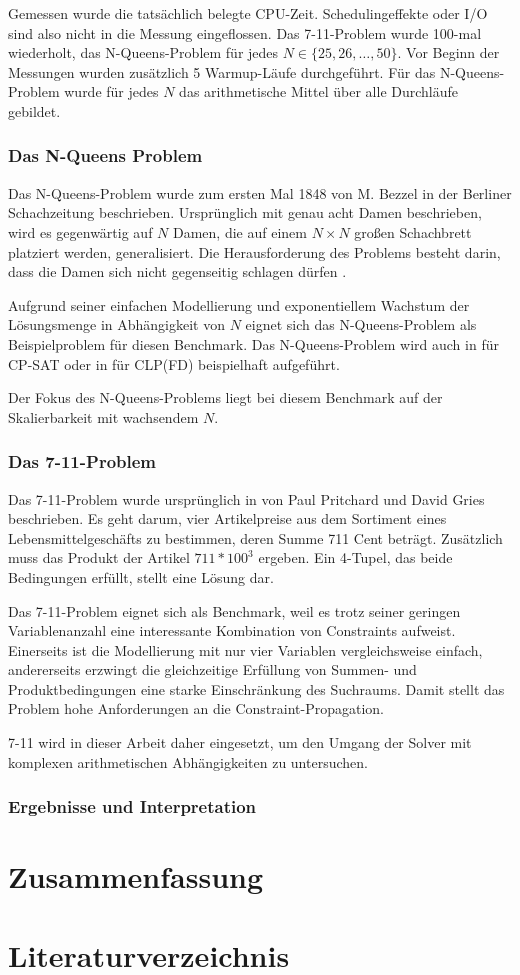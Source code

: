 \documentclass[12pt,a4paper]{article}
\begin{document}
Gemessen wurde die tatsächlich belegte CPU-Zeit.
Schedulingeffekte oder I/O sind also nicht in die Messung eingeflossen.
Das 7-11-Problem wurde 100-mal wiederholt, das N-Queens-Problem für jedes $N \in \{25,26,\dots,50\}$.
Vor Beginn der Messungen wurden zusätzlich 5 Warmup-Läufe durchgeführt.
Für das N-Queens-Problem wurde für jedes $N$ das arithmetische Mittel über alle Durchläufe gebildet.
\subsubsection{Das N-Queens Problem}
Das N-Queens-Problem wurde zum ersten Mal 1848 von M. Bezzel in der Berliner Schachzeitung beschrieben.
Ursprünglich mit genau acht Damen beschrieben, wird es gegenwärtig auf $N$ Damen, die auf einem $N \times N$ großen Schachbrett platziert werden, generalisiert.
Die Herausforderung des Problems besteht darin, dass die Damen sich nicht gegenseitig schlagen dürfen \cite{nqueens}.

Aufgrund seiner einfachen Modellierung und exponentiellem Wachstum der Lösungsmenge in Abhängigkeit von $N$ eignet sich das N-Queens-Problem als Beispielproblem für diesen Benchmark.
Das N-Queens-Problem wird auch in \cite{ortools} für CP-SAT oder in \cite{drt} für CLP(FD) beispielhaft aufgeführt. 

Der Fokus des N-Queens-Problems liegt bei diesem Benchmark auf der Skalierbarkeit mit wachsendem $N$.
\subsubsection{Das 7-11-Problem}
Das 7-11-Problem wurde ursprünglich in \cite{seven_eleven} von Paul Pritchard und David Gries beschrieben.
Es geht darum, vier Artikelpreise aus dem Sortiment eines Lebensmittelgeschäfts zu bestimmen, deren Summe 711 Cent beträgt.
Zusätzlich muss das Produkt der Artikel $711 * 100^3$ ergeben.
Ein 4-Tupel, das beide Bedingungen erfüllt, stellt eine Lösung dar. 

Das 7-11-Problem eignet sich als Benchmark, weil es trotz seiner geringen Variablenanzahl eine interessante Kombination von Constraints aufweist.
Einerseits ist die Modellierung mit nur vier Variablen vergleichsweise einfach, andererseits erzwingt die gleichzeitige Erfüllung von Summen- und Produktbedingungen eine starke Einschränkung des Suchraums.
Damit stellt das Problem hohe Anforderungen an die Constraint-Propagation.

7-11 wird in dieser Arbeit daher eingesetzt, um den Umgang der Solver mit komplexen arithmetischen Abhängigkeiten zu untersuchen.
\subsubsection{Ergebnisse und Interpretation}
\label{sec:performance}
\section{Zusammenfassung}
\section{Literaturverzeichnis}
\renewcommand*{\bibname}{} %
\renewcommand*{\refname}{} %
\printbibliography
\end{document}

